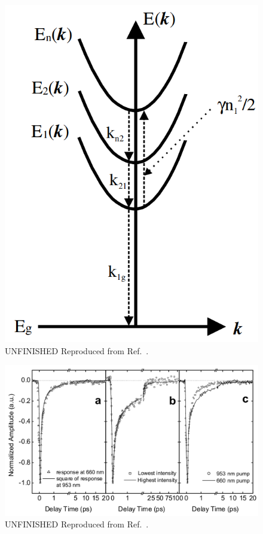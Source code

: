 \begin{figure}[ht]
	\centering
	\includegraphics[scale=0.3]{images/chapter_prior_works/exciton_schematic_ma_2005}
	\caption{{\color{red} UNFINISHED} Reproduced from Ref.\ \cite{ma2005femtosecond}.}
\end{figure}

\begin{figure}[ht]
	\centering
	\includegraphics[scale=0.4]{images/chapter_prior_works/abs_ma_2005}
	\caption{{\color{red} UNFINISHED} Reproduced from Ref.\ \cite{ma2005femtosecond}.}
\end{figure}

